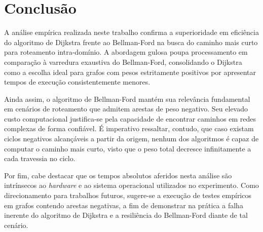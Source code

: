 \section{Conclusão}

A análise empírica realizada neste trabalho confirma a superioridade
em eficiência do algoritmo de Dijkstra frente ao Bellman-Ford na
busca do caminho mais curto para roteamento intra-domínio. A
abordagem gulosa poupa processamento em comparação à varredura
exaustiva do Bellman-Ford, consolidando o Dijkstra como a escolha
ideal para grafos com pesos estritamente positivos por apresentar
tempos de execução consistentemente menores.

Ainda assim, o algoritmo de Bellman-Ford mantém sua relevância
fundamental em cenários de roteamento que admitem arestas de peso
negativo. Seu elevado custo computacional justifica-se pela
capacidade de encontrar caminhos em redes complexas de forma
confiável. É imperativo ressaltar, contudo, que caso existam ciclos
negativos alcançáveis a partir da origem, nenhum dos algoritmos é
capaz de computar o caminho mais curto, visto que o peso total
decresce infinitamente a cada travessia no ciclo.

Por fim, cabe destacar que os tempos absolutos aferidos nesta análise
são intrínsecos ao \textit{hardware} e ao sistema operacional
utilizados no experimento. Como direcionamento para trabalhos
futuros, sugere-se a execução de testes empíricos em grafos contendo
arestas negativas, a fim de demonstrar na prática a falha inerente do
algoritmo de Dijkstra e a resiliência do Bellman-Ford diante de tal cenário.
